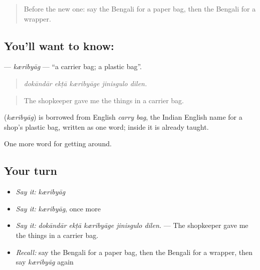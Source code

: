\label{lesson:BN-C423-keribyag}



\begin{quote}
Before the new one: say the Bengali for a paper bag, then the Bengali for a wrapper.
\end{quote}

\subsection*{You'll want to know: }
\textbf{} — \emph{kæribyāg} — \textquotedblleft{}a carrier bag; a plastic bag\textquotedblright{}.

\begin{quote}
    
\end{quote}

\begin{quote}
\emph{dokāndār ekṭā kæribyāge jinisgulo dilen.}
\end{quote}

\begin{quote}
The shopkeeper gave me the things in a carrier bag.
\end{quote}

\begin{cousinweb}
\textbf{} (\emph{kæribyāg}) is borrowed from English \emph{carry bag}, the Indian English name for a shop's plastic bag, written as one word;  inside it is already taught.
\end{cousinweb}

\begin{grammarlens}[title={What you've built}]
One more word for getting around.
\end{grammarlens}

\subsection*{Your turn}
\begin{itemize}
\raggedright
  \item \emph{Say it:} \emph{kæribyāg}
  \item \emph{Say it:} \emph{kæribyāg}, once more
  \item \emph{Say it:} \emph{dokāndār ekṭā kæribyāge jinisgulo dilen.} — The shopkeeper gave me the things in a carrier bag.
  \item \emph{Recall:} say the Bengali for a paper bag, then the Bengali for a wrapper, then say \emph{kæribyāg} again
\end{itemize}

